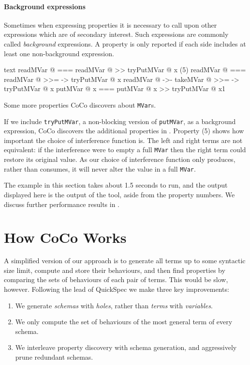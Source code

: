 \paragraph{Background expressions}
Sometimes when expressing properties it is necessary to call upon
other expressions which are of secondary interest.  Such expressions
are commonly called \emph{background} expressions.  A property is only
reported if each side includes at least one non-background expression.

\begin{listing}
\centering
\begin{cminted}{text}
      readMVar @  ===  readMVar @ >> tryPutMVar @ x
(5)   readMVar @  ===  readMVar @ >>= \x -> tryPutMVar @ x
      readMVar @  ->-  takeMVar @ >>= \x -> tryPutMVar @ x
     putMVar @ x  ===  putMVar @ x >> tryPutMVar @ x1
\end{cminted}
\caption{Some more properties CoCo discovers about \texttt{MVar}s.}\label{lst:mvar_props2}
\end{listing}

If we include \verb|tryPutMVar|, a non-blocking version of
\verb|putMVar|, as a background expression, CoCo discovers the
additional properties in .  Property (5) shows
how important the choice of interference function is.  The left and
right terms are not equivalent: if the interference were to empty a
full \verb|MVar| then the right term could restore its original value.
As our choice of interference function only produces, rather than
consumes, it will never alter the value in a full \verb|MVar|.

The example in this section takes about 1.5 seconds to run, and the
output displayed here is the output of the tool, aside from the
property numbers.  We discuss further performance results in
.

\section{How CoCo Works}
\label{sec:coco-hiw}

A simplified version of our approach is to generate all terms up to
some syntactic size limit, compute and store their behaviours, and
then find properties by comparing the sets of behaviours of each pair
of terms.  This would be slow, however.  Following the lead of
QuickSpec\cite{claessen2010,smallbone2017} we make three key
improvements:

\begin{enumerate}
\item We generate \emph{schemas} with \emph{holes}, rather than
  \emph{terms} with \emph{variables}.
\item We only compute the set of behaviours of the most general term
  of every schema.
\item We interleave property discovery with schema generation, and
  aggressively prune redundant schemas.
\end{enumerate}

